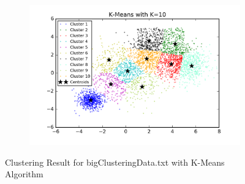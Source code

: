 \begin{description}
\begin{figure}[htb]
\begin{subfigure}[b]{0.475\textwidth}
            \includegraphics[width=\textwidth]{./figures/bigClustering_kMeans_10.png}
        \end{subfigure}
        
        \caption{Clustering Result for bigClusteringData.txt with K-Means Algorithm}
        \label{fig:kmean_clustering}
\end{figure}


\end{description}
